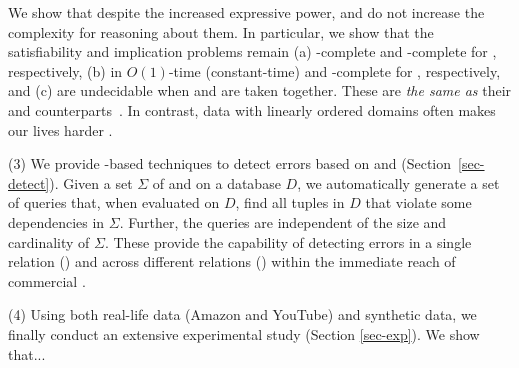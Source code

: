 We show that despite the increased expressive power,
\pCFDs and \pCINDs do not increase the complexity for
reasoning about them. In particular, we show that
the satisfiability and implication problems remain
(a) \NP-complete and \coNP-complete for \pCFDs, respectively,
(b) in $O(1)$-time (constant-time) and \EXPTIME-complete
for \pCINDs, respectively,
and (c) are undecidable when \pCFDs and \pCINDs are taken together.
These are {\em the same as} their \CFDs and \CINDs counterparts~\cite{tcs-CINDs}.
In contrast, data with linearly ordered domains often makes our lives harder \cite{Mayden97}.


\sstab
\noindent(3) We provide \SQL-based techniques to detect errors
based on \pCFDs and \pCINDs (Section~\ref{sec-detect}). Given a set $\Sigma$ of {\pCFDs}
and \pCINDs on a database $D$, we automatically generate
a set of \SQL queries that, when evaluated on $D$, find all tuples in $D$ that
violate some dependencies in $\Sigma$. Further,
the \SQL queries are independent of the size and cardinality
of $\Sigma$.
These provide the capability of detecting errors in a single
relation (\pCFDs) and across different relations (\pCINDs)
within the immediate reach of commercial \rdms.


\sstab
\noindent(4) Using both real-life data (Amazon and YouTube) and synthetic data, we finally conduct
an extensive experimental study (Section \ref{sec-exp}). We show that...

